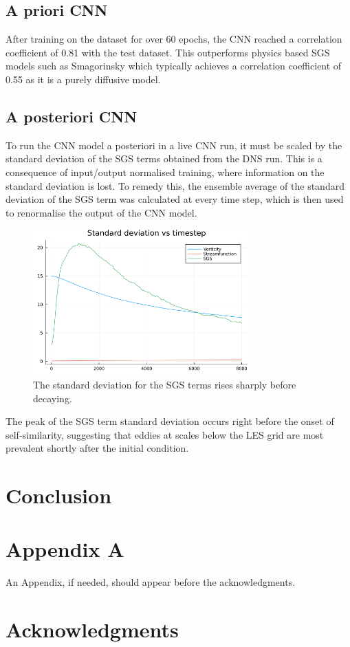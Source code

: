 \documentclass[conf]{new-aiaa}
\begin{document}
\subsection{A priori CNN}
After training on the dataset for over 60 epochs, the CNN reached a correlation coefficient of 0.81 with the test dataset. This outperforms physics based SGS models such as Smagorinsky \cite{2022_LES_CNN,pawar2020priori} which typically achieves a correlation coefficient of 0.55 as it is a purely diffusive model.
\pagebreak
\subsection{A posteriori CNN}
To run the CNN model a posteriori in a live CNN run, it must be scaled by the standard deviation of the SGS terms obtained from the DNS run. This is a consequence of input/output normalised training, where information on the standard deviation is lost. To remedy this, the ensemble average of the standard deviation of the SGS term was calculated at every time step, which is then used to renormalise the output of the CNN model.
\begin{figure}[h]
    \centering
    \includegraphics[width=0.75\textwidth]{STDs.png}
    \caption{The standard deviation for the SGS terms rises sharply before decaying.}
\end{figure}
The peak of the SGS term standard deviation occurs right before the onset of self-similarity, suggesting that eddies at scales below the LES grid are most prevalent shortly after the initial condition.

\pagebreak
\section{Conclusion}


\section*{Appendix A}
\label{appendix:A}

An Appendix, if needed, should appear before the acknowledgments.

\section*{Acknowledgments}


\end{document}
